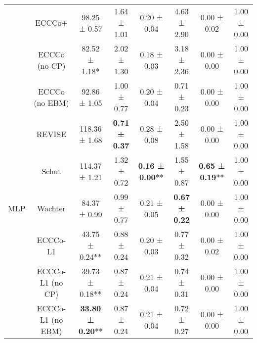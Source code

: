 \begin{table}
{\begin{tabular}[t]{cccccccc}
 & ECCCo+ & 98.25 ± 0.57\hphantom{*}\hphantom{*} & 1.64 ± 1.01\hphantom{*}\hphantom{*} & 0.20 ± 0.04\hphantom{*}\hphantom{*} & 4.63 ± 2.90\hphantom{*}\hphantom{*} & 0.00 ± 0.02\hphantom{*}\hphantom{*} & 1.00 ± 0.00\hphantom{*}\hphantom{*}\\

 & ECCCo (no CP) & 82.52 ± 1.18*\hphantom{*} & 2.02 ± 1.30\hphantom{*}\hphantom{*} & 0.18 ± 0.03\hphantom{*}\hphantom{*} & 3.18 ± 2.36\hphantom{*}\hphantom{*} & 0.00 ± 0.00\hphantom{*}\hphantom{*} & 1.00 ± 0.00\hphantom{*}\hphantom{*}\\

 & ECCCo (no EBM) & 92.86 ± 1.05\hphantom{*}\hphantom{*} & 1.00 ± 0.77\hphantom{*}\hphantom{*} & 0.20 ± 0.04\hphantom{*}\hphantom{*} & 0.71 ± 0.23\hphantom{*}\hphantom{*} & 0.00 ± 0.00\hphantom{*}\hphantom{*} & 1.00 ± 0.00\hphantom{*}\hphantom{*}\\

 & REVISE & 118.36 ± 1.68\hphantom{*}\hphantom{*} & \textbf{0.71 ± 0.37}\hphantom{*}\hphantom{*} & 0.28 ± 0.08\hphantom{*}\hphantom{*} & 2.50 ± 1.58\hphantom{*}\hphantom{*} & 0.00 ± 0.00\hphantom{*}\hphantom{*} & 1.00 ± 0.00\hphantom{*}\hphantom{*}\\

 & Schut & 114.37 ± 1.21\hphantom{*}\hphantom{*} & 1.32 ± 0.72\hphantom{*}\hphantom{*} & \textbf{0.16 ± 0.00}** & 1.55 ± 0.87\hphantom{*}\hphantom{*} & \textbf{0.65 ± 0.19}** & 1.00 ± 0.00\hphantom{*}\hphantom{*}\\

\multirow[t]{-10}{*}{\centering\arraybackslash MLP} & Wachter & 84.37 ± 0.99\hphantom{*}\hphantom{*} & 0.99 ± 0.77\hphantom{*}\hphantom{*} & 0.21 ± 0.05\hphantom{*}\hphantom{*} & \textbf{0.67 ± 0.22}\hphantom{*}\hphantom{*} & 0.00 ± 0.00\hphantom{*}\hphantom{*} & 1.00 ± 0.00\hphantom{*}\hphantom{*}\\
\cmidrule{1-8}
 & ECCCo-L1 & 43.75 ± 0.24** & 0.88 ± 0.24\hphantom{*}\hphantom{*} & 0.20 ± 0.03\hphantom{*}\hphantom{*} & 0.77 ± 0.32\hphantom{*}\hphantom{*} & 0.00 ± 0.02\hphantom{*}\hphantom{*} & 1.00 ± 0.00\hphantom{*}\hphantom{*}\\

 & ECCCo-L1 (no CP) & 39.73 ± 0.18** & 0.87 ± 0.24\hphantom{*}\hphantom{*} & 0.21 ± 0.04\hphantom{*}\hphantom{*} & 0.74 ± 0.31\hphantom{*}\hphantom{*} & 0.00 ± 0.00\hphantom{*}\hphantom{*} & 1.00 ± 0.00\hphantom{*}\hphantom{*}\\

 & ECCCo-L1 (no EBM) & \textbf{33.80 ± 0.20}** & 0.87 ± 0.24\hphantom{*}\hphantom{*} & 0.21 ± 0.04\hphantom{*}\hphantom{*} & 0.72 ± 0.27\hphantom{*}\hphantom{*} & 0.00 ± 0.00\hphantom{*}\hphantom{*} & 1.00 ± 0.00\hphantom{*}\hphantom{*}\\


\end{tabular}}
\end{table}
